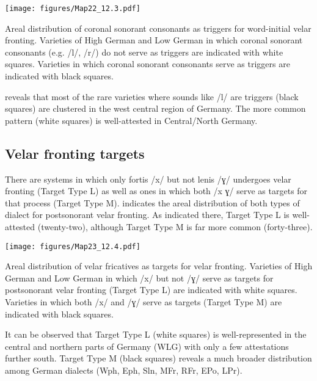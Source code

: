 \begin{map}[p]
\texttt{[image: figures/Map22\_12.3.pdf]}
\caption[Areal distribution of coronal sonorant consonants as triggers for word-initial velar fronting]{Areal distribution of coronal sonorant consonants as triggers for word-initial velar fronting. Varieties of High German and Low German in which coronal sonorant consonants (e.g. /l/, /r/) do not serve as triggers are indicated with white squares. Varieties in which coronal sonorant consonants serve as triggers are indicated with black squares.}
\label{map:12:22}\label{map:22}
\end{map}\clearpage\largerpage[2]

 reveals that most of the rare varieties where sounds like /l/ are triggers (black squares) are clustered in the west central region of Germany. The more common pattern (white squares) is well-attested in Central/North Germany.

\subsection{Velar fronting targets}\label{sec:12.4.2}

There are systems in which only fortis /x/ but not lenis /ɣ/ undergoes velar fronting (Target Type L) as well as ones in which both /x ɣ/ serve as targets for that process (Target Type M).   indicates the areal distribution of both types of dialect for postsonorant velar fronting. As indicated there, Target Type L is well-attested (twenty-two), although Target Type M is far more common (forty-three).

\begin{map}[p]
\texttt{[image: figures/Map23\_12.4.pdf]}
\caption[Areal distribution of velar fricatives as targets for velar fronting]{Areal distribution of velar fricatives as targets for velar fronting. Varieties of High German and Low German in which /x/ but not /ɣ/ serve as targets for postsonorant velar fronting (Target Type L) are indicated with white squares. Varieties in which both /x/ and /ɣ/ serve as targets (Target Type M) are indicated with black squares.}
\label{map:12:23}\label{map:23}
\end{map}

It can be observed that Target Type L (white squares) is well-represented in the central and northern parts of Germany (WLG) with only a few attestations further south. Target Type M (black squares) reveals a much broader distribution among German dialects (Wph, Eph, Sln, MFr, RFr, EPo, LPr).

